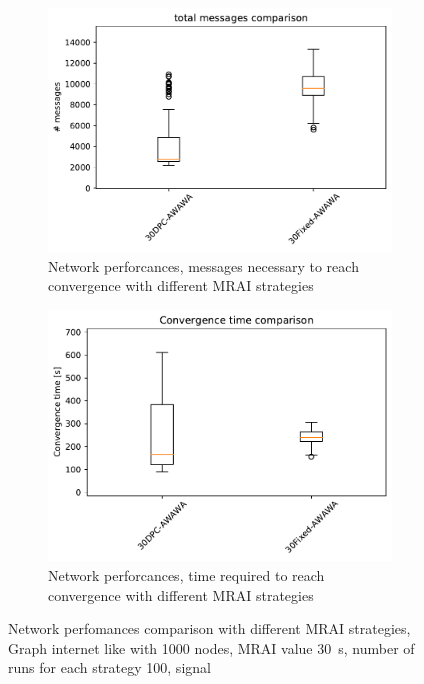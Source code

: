 \begin{figure}[h]
     \centering
     \begin{subfigure}[b]{0.45\textwidth}
         \centering
         \includegraphics[width=\textwidth]{images/internet_like/1000/comparison/comparison_AWAWA_messages_boxplot.pdf}
		 \caption{Network perforcances, messages necessary to reach convergence
			with different \ac{MRAI} strategies}
         \label{fig:boxplot_internet_like_1000_messages_AWAWA}
     \end{subfigure}
     \hfill
     \begin{subfigure}[b]{0.45\textwidth}
         \centering
         \includegraphics[width=\textwidth]{images/internet_like/1000/comparison/comparison_AWAWA_time_boxplot.pdf}
		 \caption{Network perforcances, time required to reach convergence
			with different \ac{MRAI} strategies}
         \label{fig:boxplot_internet_like_1000_time_AWAWA}
     \end{subfigure}
	 \caption{Network perfomances comparison with different \ac{MRAI} strategies,
		Graph internet like with \num{1000} nodes, \ac{MRAI} value 
		\SI{30}{\second}, number of runs for each strategy \num{100}, signal }
        \label{fig:boxplot_internet_like_1000_AWAWA}
\end{figure}

